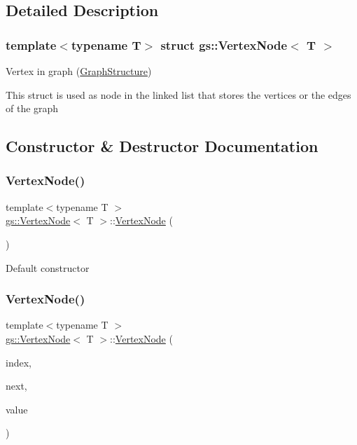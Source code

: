 \subsection{Detailed Description}
\subsubsection*{template$<$typename T$>$\newline
struct gs\+::\+Vertex\+Node$<$ T $>$}

Vertex in graph (\mbox{\hyperlink{classgs_1_1_graph_structure}{Graph\+Structure}}) 

This struct is used as node in the linked list that stores the vertices or the edges of the graph 

\subsection{Constructor \& Destructor Documentation}
\mbox{\label{structgs_1_1_vertex_node_af11908bdb28303e9d9ee6eccdfe50b67}} 
\subsubsection{\texorpdfstring{Vertex\+Node()}{VertexNode()}\hspace{0.1cm}{\footnotesize\ttfamily [1/2]}}
{\footnotesize\ttfamily template$<$typename T $>$ \\
\mbox{\hyperlink{structgs_1_1_vertex_node}{gs\+::\+Vertex\+Node}}$<$ T $>$\+::\mbox{\hyperlink{structgs_1_1_vertex_node}{Vertex\+Node}} (\begin{DoxyParamCaption}{ }\end{DoxyParamCaption})}

Default constructor \mbox{\label{structgs_1_1_vertex_node_a82bd37d0baf6474fb174a3bf5f9147ed}} 
\subsubsection{\texorpdfstring{Vertex\+Node()}{VertexNode()}\hspace{0.1cm}{\footnotesize\ttfamily [2/2]}}
{\footnotesize\ttfamily template$<$typename T $>$ \\
\mbox{\hyperlink{structgs_1_1_vertex_node}{gs\+::\+Vertex\+Node}}$<$ T $>$\+::\mbox{\hyperlink{structgs_1_1_vertex_node}{Vertex\+Node}} (\begin{DoxyParamCaption}\item[{std\+::size\+\_\+t}]{index,  }\item[{\mbox{\hyperlink{structgs_1_1_vertex_node}{Vertex\+Node}}$<$ T $>$ $\ast$}]{next,  }\item[{T}]{value }\end{DoxyParamCaption})}




